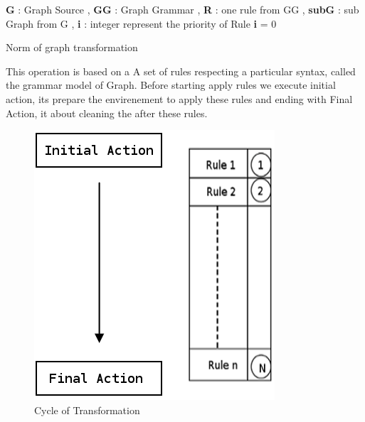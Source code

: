 \begin{algorithm}[H]
\SetAlgoLined

\textbf{G} : Graph Source , \textbf{GG} : Graph Grammar  ,
\textbf{R} : one rule from GG , \textbf{subG} : sub Graph from G ,
\textbf{i} : integer represent the priority of Rule \;
\textbf{i} = 0 \; 
  
 \caption{Norm of graph transformation}
\end{algorithm}

 
This operation is based on a A set of rules respecting a particular 
syntax, called the grammar model of Graph.
Before starting apply rules we execute initial action, 
its prepare the envirenement to apply these rules
and ending with Final Action, it about cleaning the after these rules\cite{ch3-bid, ch3-spec}.
\begin{figure}[th]
	\centering
		\includegraphics[scale=0.45]{ch3/img/transGrammar}
	\caption{\label{fig:Cycle of Tranformation}Cycle of Transformation\cite{ch3-img}}
\end{figure} 

 

